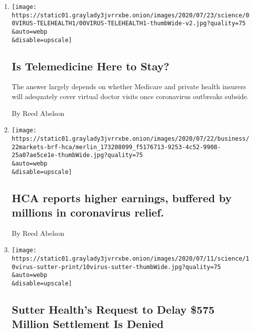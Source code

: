 \begin{enumerate}
\def\labelenumi{\arabic{enumi}.}
\item
  \href{/2020/08/03/health/covid-telemedicine-congress.html}{}

  \texttt{[image: https://static01.graylady3jvrrxbe.onion/images/2020/07/23/science/00VIRUS-TELEHEALTH1/00VIRUS-TELEHEALTH1-thumbWide-v2.jpg?quality=75\\\&auto=webp\\\&disable=upscale]}

  \hypertarget{is-telemedicine-here-to-stay}{%
  \subsection{Is Telemedicine Here to
  Stay?}\label{is-telemedicine-here-to-stay}}

  The answer largely depends on whether Medicare and private health
  insurers will adequately cover virtual doctor visits once coronavirus
  outbreaks subside.

  By Reed Abelson
\item
  \href{/2020/07/22/business/hca-reports-higher-earnings-buffered-by-millions-in-coronavirus-relief.html}{}

  \texttt{[image: https://static01.graylady3jvrrxbe.onion/images/2020/07/22/business/22markets-brf-hca/merlin\_173208099\_f5176713-9253-4c52-9908-25a07ae5ce1e-thumbWide.jpg?quality=75\\\&auto=webp\\\&disable=upscale]}

  \hypertarget{hca-reports-higher-earnings-buffered-by-millions-in-coronavirus-relief}{%
  \subsection{HCA reports higher earnings, buffered by millions in
  coronavirus
  relief.}\label{hca-reports-higher-earnings-buffered-by-millions-in-coronavirus-relief}}

  By Reed Abelson
\item
  \href{/2020/07/10/health/coronavirus-sutter-california-hospitals.html}{}

  \texttt{[image: https://static01.graylady3jvrrxbe.onion/images/2020/07/11/science/10virus-sutter-print/10virus-sutter-thumbWide.jpg?quality=75\\\&auto=webp\\\&disable=upscale]}

  \hypertarget{sutter-healths-request-to-delay-575-million-settlement-is-denied}{%
  \subsection{Sutter Health's Request to Delay \$575 Million Settlement
  Is
  Denied}\label{sutter-healths-request-to-delay-575-million-settlement-is-denied}}


\end{enumerate}
